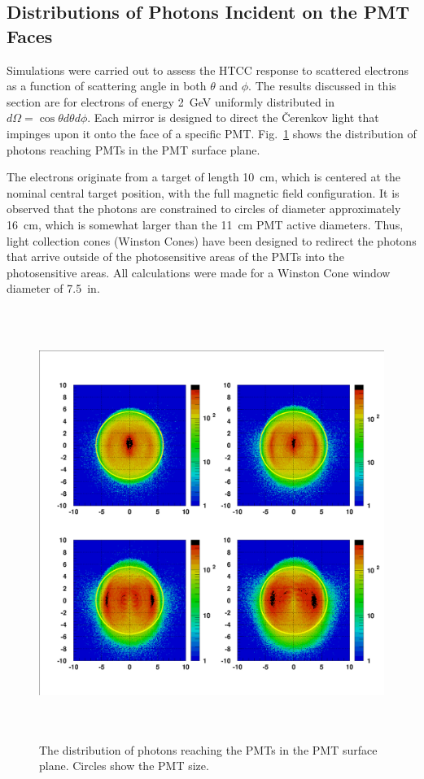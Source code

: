 \subsection{Distributions of Photons Incident on the PMT Faces}

Simulations were carried out to assess the HTCC response to scattered
electrons as a function of scattering angle in both $\theta$ and $\phi$.  
The results discussed in this section are for electrons of energy 2~GeV 
uniformly distributed in $d\Omega=\cos \theta d\theta d\phi$.  Each mirror 
is designed to direct the {\v C}erenkov light that impinges upon it onto 
the face of a specific PMT.  Fig.~\ref{four-tubes} shows the distribution 
of photons reaching PMTs in the PMT surface plane. 

The electrons originate from a target of length 10~cm, which is centered at 
the nominal central target position, with the full magnetic field 
configuration.  It is observed that the photons are constrained to circles 
of diameter approximately 16~cm, which is somewhat larger than the 11~cm 
PMT active diameters. Thus, light collection cones (Winston Cones) have 
been designed to redirect the photons that arrive outside of the 
photosensitive areas of the PMTs into the photosensitive areas.  All 
calculations were made for a Winston Cone window diameter of 7.5~in. 

\begin{figure}[htbp]
\centering
\includegraphics[height=14cm,angle=0]{MC-simulation/all_pmt.eps}
\caption{\small{The distribution of photons reaching the PMTs in the PMT
surface plane. Circles show the PMT size.}}
\label{four-tubes}
\end{figure}

